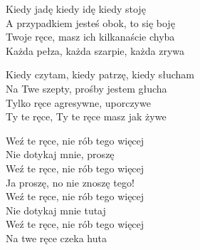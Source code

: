 \begin{text}
    Kiedy jadę kiedy idę kiedy stoję\\
    A przypadkiem jesteś obok, to się boję\\
    Twoje ręce, masz ich kilkanaście chyba\\
    Każda pełza, każda szarpie, każda zrywa

    Kiedy czytam, kiedy patrzę, kiedy słucham\\
    Na Twe szepty, prośby jestem głucha\\
    Tylko ręce agresywne, uporczywe\\
    Ty te ręce, Ty te ręce masz jak żywe

    Weź te ręce, nie rób tego więcej\\
    Nie dotykaj mnie, proszę\\
    Weź te ręce, nie rób tego więcej\\
    Ja proszę, no nie znoszę tego!\\
    Weź te ręce, nie rób tego więcej\\
    Nie dotykaj mnie tutaj\\
    Weź te ręce, nie rób tego więcej\\
    Na twe ręce czeka huta
\end{text}
\begin{chord}

\end{chord}